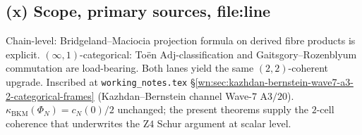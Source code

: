 \subsection*{(x) Scope, primary sources, file:line}

Chain-level: Bridgeland--Maciocia projection formula on derived
fibre products is explicit. $(\infty,1)$-categorical: Toën
$\mathrm{Adj}$-classification and Gaitsgory--Rozenblyum commutation
are load-bearing. Both lanes yield the same $(2,2)$-coherent
upgrade. Inscribed at
\texttt{working\_notes.tex}
\S\ref{wn:sec:kazhdan-bernstein-wave7-a3-2-categorical-frames}
(Kazhdan--Bernstein channel Wave-$7$ A$3/20$).
$\kappa_{\mathrm{BKM}}(\Phi_N) = c_N(0)/2$ unchanged; the present
theorems supply the $2$-cell coherence that underwrites the
Z$4$ Schur argument at scalar level.
